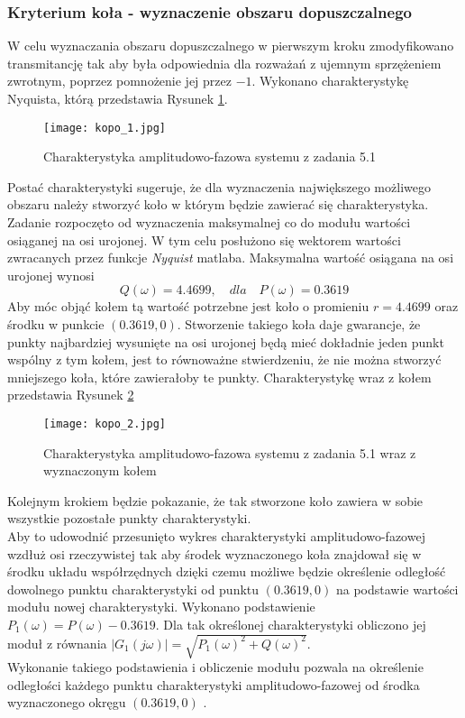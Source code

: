 \documentclass[a4paper,11pt]{article}
\begin{document}
\subsubsection{Kryterium koła - wyznaczenie obszaru dopuszczalnego}
W celu wyznaczania obszaru dopuszczalnego w pierwszym kroku zmodyfikowano transmitancję tak aby była odpowiednia dla rozważań z ujemnym sprzężeniem zwrotnym, poprzez pomnożenie jej przez \(-1\). Wykonano charakterystykę Nyquista, którą przedstawia Rysunek \ref{fig:kopo_1}.
\begin{figure}[H]
\centerline{\texttt{[image: kopo\_1.jpg]}}
\caption{Charakterystyka amplitudowo-fazowa systemu z zadania 5.1}
\label{fig:kopo_1}
\end{figure}
Postać charakterystyki sugeruje, że dla wyznaczenia największego możliwego obszaru należy stworzyć koło w którym będzie zawierać się charakterystyka. \\
Zadanie rozpoczęto od wyznaczenia maksymalnej co do modułu wartości osiąganej na osi urojonej. W tym celu posłużono się wektorem wartości zwracanych przez funkcje \textit{Nyquist} matlaba. Maksymalna wartość osiągana na osi urojonej wynosi
\begin{equation*}
Q(\omega)=4.4699, \quad dla \quad P(\omega)=0.3619
\end{equation*}
Aby móc objąć kołem tą wartość potrzebne jest koło o promieniu \(r = 4.4699 \) oraz środku w punkcie \( (0.3619, 0) \). Stworzenie takiego koła daje gwarancje, że punkty najbardziej wysunięte na osi urojonej będą mieć dokładnie jeden punkt wspólny z tym kołem, jest to równoważne stwierdzeniu, że nie można stworzyć mniejszego koła, które zawierałoby te punkty. Charakterystykę wraz z kołem przedstawia Rysunek \ref{fig:kopo_2} \\
\begin{figure}[H]
\centerline{\texttt{[image: kopo\_2.jpg]}}
\caption{Charakterystyka amplitudowo-fazowa systemu z zadania 5.1 wraz z wyznaczonym kołem}
\label{fig:kopo_2}
\end{figure}
Kolejnym krokiem będzie pokazanie, że tak stworzone koło zawiera w sobie wszystkie pozostałe punkty charakterystyki. \\
Aby to udowodnić przesunięto wykres charakterystyki amplitudowo-fazowej wzdłuż osi rzeczywistej tak aby środek wyznaczonego koła znajdował się w środku układu współrzędnych dzięki czemu możliwe będzie określenie odległość dowolnego punktu charakterystyki od punktu \( (0.3619, 0) \) na podstawie wartości modułu nowej charakterystyki. Wykonano podstawienie \\ \( P_{1}(\omega) = P(\omega)- 0.3619 \). Dla tak określonej charakterystyki obliczono jej moduł z równania \(|G_{1}(j\omega)|=\sqrt{P_{1}(\omega)^2+Q(\omega)^2} \). \\ Wykonanie takiego podstawienia i obliczenie modułu pozwala na określenie odległości każdego punktu charakterystyki amplitudowo-fazowej od środka wyznaczonego okręgu \( (0.3619, 0) \) .
\end{document}
